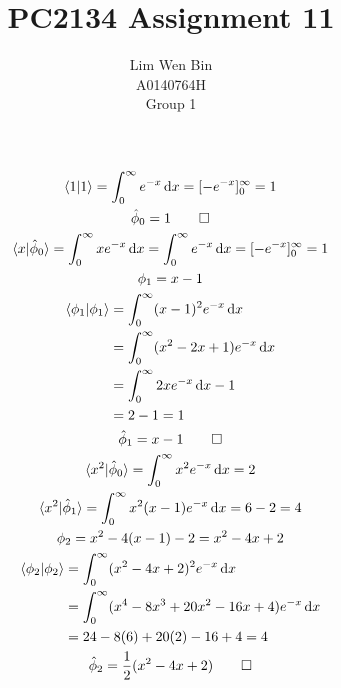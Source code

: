 \documentclass[12pt]{article}
\newcommand*\diff{\mathop{}\!\mathrm{d}}
\newenvironment{problem}[2][Problem]{\begin{trivlist}
\item[\hskip \labelsep {\bfseries #1}\hskip \labelsep {\bfseries #2.}]}{\end{trivlist}}
\begin{document}
\title{PC2134 Assignment 11}
\author{Lim Wen Bin \\
A0140764H\\
Group 1}
\maketitle

\begin{problem}{1}
\end{problem}
\begin{gather*}
	\braket{1|1} = \int_0^\infty e^{-x} \diff x 
		= [ -e^{-x} ]_0^\infty = 1 
	\\
	\hat{\phi}_0 = 1 \qed \\
	\braket{x|\hat{\phi}_0} = \int_0^\infty xe^{-x} \diff x 
		= \int_0^\infty e^{-x} \diff x 
		= [ -e^{-x} ]_0^\infty = 1 
	\\
	\phi_1 = x - 1 \\
	\begin{aligned}
		\braket{\phi_1|\phi_1} &= \int_0^\infty (x-1)^2 e^{-x} \diff x \\
		&= \int_0^\infty (x^2 - 2x + 1) e^{-x} \diff x \\
		&= \int_0^\infty 2 x e^{-x} \diff x - 1 \\
		&= 2 - 1 = 1
	\end{aligned} \\
	\hat{\phi}_1 = x-1 \qed \\
	\braket{x^2|\hat{\phi}_0} = \int_0^\infty x^2 e^{-x} \diff x = 2 \\
	\braket{x^2|\hat{\phi}_1} = \int_0^\infty x^2 (x-1) e^{-x} \diff x 
		= 6 - 2  = 4 \\
	\phi_2 = x^2 - 4(x-1) - 2 = x^2 - 4x + 2 \\
	\begin{aligned}
		\braket{\phi_2|\phi_2} &= \int_0^\infty (x^2 - 4x + 2)^2 e^{-x} \diff x \\
		&= \int_0^\infty (x^4 - 8x^3 + 20x^2 - 16x + 4) e^{-x} \diff x \\
		&= 24 - 8(6) + 20(2) - 16 + 4 = 4 \\
	\end{aligned} \\
	\hat{\phi}_2 = \frac{1}{2}(x^2 - 4x + 2) \qed
\end{gather*}
\end{document}
